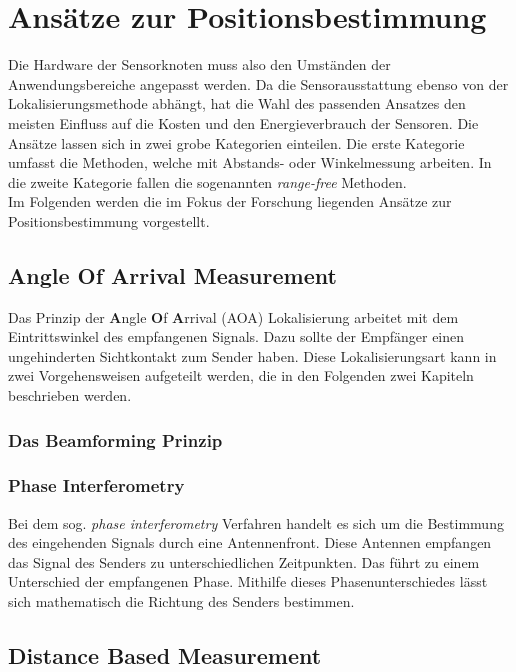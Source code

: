 \documentclass[12pt, a4wide]{scrreprt}
\begin{document}

\chapter{Ansätze zur Positionsbestimmung}
Die Hardware der Sensorknoten muss also den Umständen der Anwendungsbereiche angepasst werden. Da die Sensorausstattung ebenso von der Lokalisierungsmethode abhängt, hat die Wahl des passenden Ansatzes den meisten Einfluss auf die Kosten und den Energieverbrauch der Sensoren. Die Ansätze lassen sich in zwei grobe Kategorien einteilen. Die erste Kategorie umfasst die Methoden, welche mit Abstands- oder Winkelmessung arbeiten. In die zweite Kategorie fallen die sogenannten \textit{range-free} Methoden.\\ 
\indent
Im Folgenden werden die im Fokus der Forschung liegenden Ansätze zur Positionsbestimmung vorgestellt.
  \section{Angle Of Arrival Measurement}
Das Prinzip der {\bf A}ngle {\bf O}f {\bf A}rrival (AOA) Lokalisierung arbeitet mit dem Eintrittswinkel des empfangenen Signals. Dazu sollte der Empfänger einen ungehinderten Sichtkontakt zum Sender haben. Diese Lokalisierungsart kann in zwei Vorgehensweisen aufgeteilt werden, die in den Folgenden zwei Kapiteln beschrieben werden.
    \subsection{Das Beamforming Prinzip}

    \subsection{Phase Interferometry}
Bei dem sog. \textit{phase interferometry}\cite{q1} Verfahren handelt es sich um die Bestimmung des eingehenden Signals durch eine Antennenfront. Diese Antennen empfangen das Signal des Senders zu unterschiedlichen Zeitpunkten. Das führt zu einem Unterschied der empfangenen Phase. Mithilfe dieses Phasenunterschiedes lässt sich mathematisch die Richtung des Senders bestimmen.
  \section{Distance Based Measurement}
\end{document}

